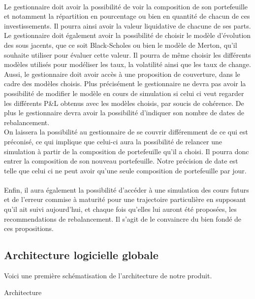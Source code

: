 \documentclass[french,12pt,a4paper]{article}
\begin{document}
\indent \\
\indent Le gestionnaire doit avoir la possibilité de voir la composition de son portefeuille et notamment la répartition en pourcentage ou bien en quantité de chacun de ces investissements. Il pourra ainsi avoir la valeur liquidative de chacune de ses parts. Le gestionnaire doit également avoir la possibilité de choisir le modèle d'évolution des sous jacents, que ce soit Black-Scholes ou bien le modèle de Merton, qu'il souhaite utiliser pour évaluer cette valeur. Il pourra de même choisir les différents modèles utilisés pour modéliser les taux, la volatilité ainsi que les taux de change. 
\indent \\
\indent Aussi, le gestionnaire doit avoir accès à une proposition de couverture, dans le cadre des modèles choisis. Plus précisément le gestionnaire ne devra pas avoir la possibilité de modifier le modèle en cours de simulation si celui ci veut regarder les différents P\&L obtenus avec les modèles choisis, par soucis de cohérence. De plus le gestionnaire devra avoir la possibilité d'indiquer son nombre de dates de rebalancement.\\
On laissera la possibilité au gestionnaire de se couvrir différemment de ce qui est préconisé, ce qui implique que celui-ci aura la possibilité de relancer une simulation à partir de la composition de portefeuille qu'il a choisi. Il pourra donc entrer la composition de son nouveau portefeuille. Notre précision de date est telle que celui ci ne peut avoir qu'une seule composition de portefeuille par jour.\\
\indent \\
\indent Enfin, il aura également la possibilité d'accéder à une simulation des cours futurs et de l'erreur commise à maturité pour une trajectoire particulière en supposant qu'il ait suivi aujourd'hui, et chaque fois qu'elles lui auront été proposées, les recommendations de rebalancement. Il s'agit de le convaincre du bien fondé de ces propositions.

\subsection{Architecture logicielle globale}

Voici une première schématisation de l'architecture de notre produit.

\begin{center}
\caption{Architecture}
\end{center}
\end{document}
